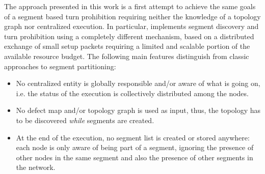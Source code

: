 The \disr{} approach presented in this work is a first attempt to
achieve the same goals of a segment based turn prohibition
requiring neither the knowledge of a topology graph nor centralized execution. In particular,
\disr{} implements segment discovery and turn prohibition using a
completely different mechanism, based on a distributed exchange of
small setup packets requiring a limited and scalable portion of the available
resource budget. The following main features distinguish \disr{}
from classic approaches to segment partitioning: 
\begin{itemize}
\item No centralized entity is globally responsible and/or aware of
what is going on, i.e. the status of the \disr{} execution is
collectively distributed among the nodes.
\item  No defect map and/or topology graph is used as input,
thus, the topology has to be discovered \emph{while} segments are
created.
\item At the end of the execution, no segment list is created or
stored anywhere: each node is only aware of being part of a segment,
ignoring the presence of other nodes in the same segment and also the
presence of other segments in the network.
\end{itemize}


